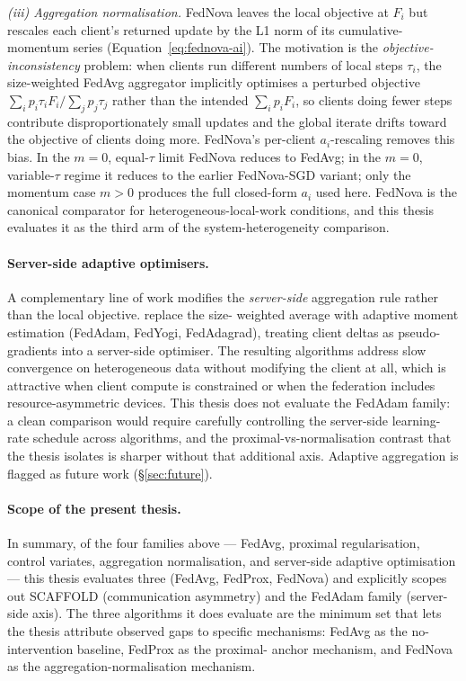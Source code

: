 \documentclass[11pt,a4paper]{article}
\begin{document}
\emph{(iii) Aggregation normalisation.} FedNova \citep{wang2020fednova}
leaves the local objective at $F_i$ but rescales each client's returned
update by the L1 norm of its cumulative-momentum series
(Equation~\ref{eq:fednova-ai}). The motivation is the
\emph{objective-inconsistency} problem: when clients run different numbers
of local steps $\tau_i$, the size-weighted FedAvg aggregator implicitly
optimises a perturbed objective $\sum_i p_i \tau_i F_i / \sum_j p_j \tau_j$
rather than the intended $\sum_i p_i F_i$, so clients doing fewer steps
contribute disproportionately small updates and the global iterate drifts
toward the objective of clients doing more. FedNova's per-client
$a_i$-rescaling removes this bias. In the $m=0$, equal-$\tau$ limit FedNova
reduces to FedAvg; in the $m=0$, variable-$\tau$ regime it reduces to the
earlier FedNova-SGD variant; only the momentum case $m > 0$ produces the
full closed-form $a_i$ used here. FedNova is the canonical comparator for
heterogeneous-local-work conditions, and this thesis evaluates it as the
third arm of the system-heterogeneity comparison.

\paragraph{Server-side adaptive optimisers.}
A complementary line of work modifies the \emph{server-side} aggregation rule
rather than the local objective. \citet{reddi2021adaptive} replace the size-
weighted average with adaptive moment estimation (FedAdam, FedYogi, FedAdagrad),
treating client deltas as pseudo-gradients into a server-side optimiser. The
resulting algorithms address slow convergence on heterogeneous data without
modifying the client at all, which is attractive when client compute is
constrained or when the federation includes resource-asymmetric devices.
This thesis does not evaluate the FedAdam family: a clean comparison would
require carefully controlling the server-side learning-rate schedule across
algorithms, and the proximal-vs-normalisation contrast that the thesis
isolates is sharper without that additional axis. Adaptive aggregation is
flagged as future work (\S\ref{sec:future}).

\paragraph{Scope of the present thesis.}
In summary, of the four families above --- FedAvg, proximal regularisation,
control variates, aggregation normalisation, and server-side adaptive
optimisation --- this thesis evaluates three (FedAvg, FedProx, FedNova) and
explicitly scopes out SCAFFOLD (communication asymmetry) and the FedAdam
family (server-side axis). The three algorithms it does evaluate are the
minimum set that lets the thesis attribute observed gaps to specific
mechanisms: FedAvg as the no-intervention baseline, FedProx as the proximal-
anchor mechanism, and FedNova as the aggregation-normalisation mechanism.
\end{document}
